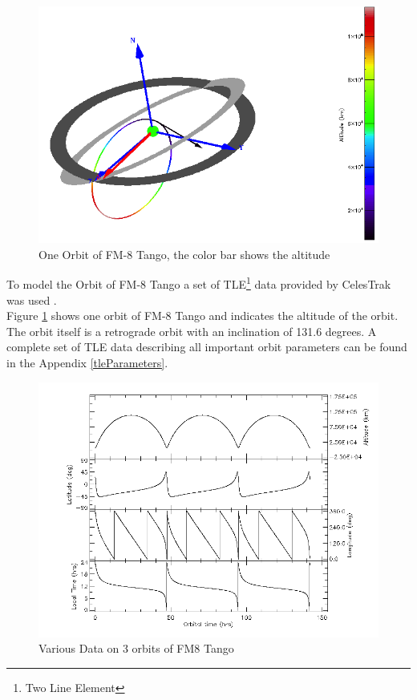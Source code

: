 \begin{figure}[h]
	\centering
	\includegraphics[width=\linewidth-15em]{spenvis/3d_gei}
		\caption{One Orbit of FM-8 Tango, the color bar shows the altitude}
	\label{fig:orbit}
\end{figure}
To model the Orbit of FM-8 Tango a set of TLE\footnote{Two Line Element} data provided by CelesTrak was used \citep{celesTrak}.\\
Figure \ref{fig:orbit} shows one orbit of FM-8 Tango and indicates the altitude of the orbit. The orbit itself is a retrograde orbit with an inclination of 131.6 degrees. A complete set of TLE data describing all important orbit parameters can be found in the Appendix \ref{tleParameters}.
\begin{figure}[H]
	\centering
	\includegraphics[width=\linewidth-15em]{spenvis/cans}
		\caption{Various Data on 3 orbits of FM8 Tango}
	\label{fig:orbitData}
\end{figure}


